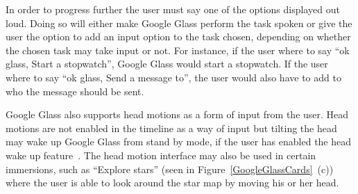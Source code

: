 In order to progress further the user must say one of the options displayed out loud. Doing so will either make Google Glass perform the task spoken or give the user the option to add an input option to the task chosen, depending on whether the chosen task may take input or not. For instance, if the user where to say ``ok glass, Start a stopwatch'', Google Glass would start a stopwatch. If the user where to say ``ok glass, Send a message to'', the user would also have to add to who the message should be sent.

Google Glass also supports head motions as a form of input from the user. Head motions are not enabled in the timeline as a way of input but tilting the head may wake up Google Glass from stand by mode, if the user has enabled the head wake up feature~\cite{headWakeUp}. The head motion interface may also be used in certain immersions, such as ``Explore stars'' (seen in Figure~\ref{GoogleGlassCards}~(c)) where the user is able to look around the star map by moving his or her head.




